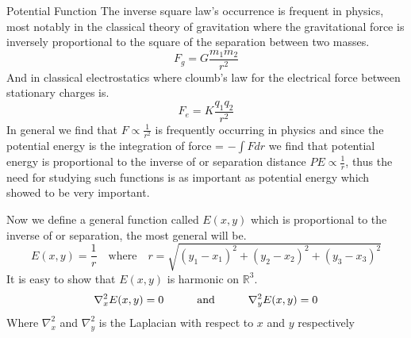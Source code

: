 \documentclass[]{article}
\begin{document}
\vfill
\begin{enrichment*}{Potential Function}
        The inverse square law's occurrence is frequent in physics, most notably in the classical theory of gravitation where the gravitational force is inversely proportional to the square of the separation between two masses.
    \[
        F_g = G\frac{m_1 m_2}{r^2}    
    \]
    And in classical electrostatics where cloumb's law for the electrical force between stationary charges is.
    \[
        F_e = K\frac{q_1 q_2}{r^2}    
    \]
    In general we find that $\displaystyle F \propto \frac{1}{r^2}$ is frequently occurring in physics and since the potential energy is the integration of force
    = $\displaystyle -\int F dr$ we find that potential energy is proportional to the inverse of or separation distance $\displaystyle PE \propto \frac{1}{r}$, thus the need for studying such functions is as important as potential energy which showed to be very important.
    \par
    Now we define a general function called $E(x,y)$ which is proportional to the inverse of or separation, the most general will be.
    \[
        E(x,y) = \frac{1}{r} \quad \text{where} \quad r = \sqrt{(y_1-x_1)^2 + (y_2-x_2)^2 + (y_3-x_3)^2}    
    \]
    It is easy to show that $E(x,y)$ is harmonic on $\mathbb{R}^3$.
    \[
        \nabla_{x}^{2} E(x,y) = 0 \quad\quad\quad \text{and} \quad\quad\quad \nabla_{y}^{2} E(x,y) = 0    
    \]
    Where $\nabla_{x}^{2}$ and $\nabla_{y}^{2}$ is the Laplacian with respect to $x$ and $y$ respectively
\end{enrichment*}    
\end{document}
